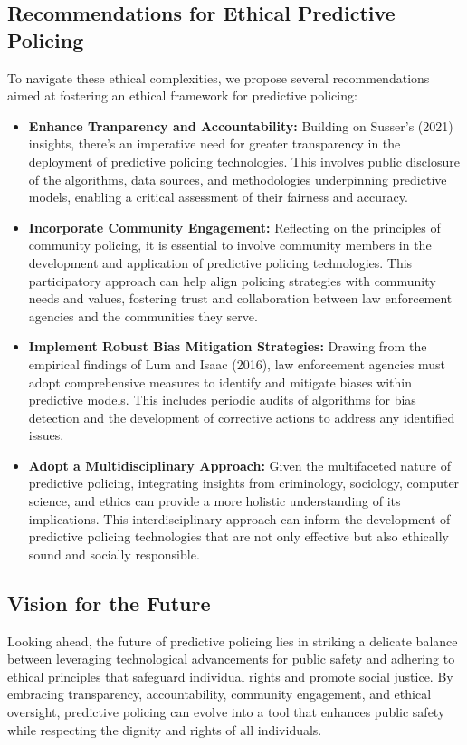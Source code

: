 \documentclass[man, noextraspace]{apa7} %
\begin{document}
\subsection{Recommendations for Ethical Predictive Policing}
To navigate these ethical complexities, we propose several recommendations aimed at fostering an ethical framework for predictive policing:
\begin{itemize}
    \item \textbf{Enhance Tranparency and Accountability:} Building on Susser’s (2021) insights, there's an imperative need for greater transparency in the deployment of predictive policing technologies. This involves public disclosure of the algorithms, data sources, and methodologies underpinning predictive models, enabling a critical assessment of their fairness and accuracy.
    \item \textbf{Incorporate Community Engagement:}  Reflecting on the principles of community policing, it is essential to involve community members in the development and application of predictive policing technologies. This participatory approach can help align policing strategies with community needs and values, fostering trust and collaboration between law enforcement agencies and the communities they serve.
    \item \textbf{Implement Robust Bias Mitigation Strategies:} Drawing from the empirical findings of Lum and Isaac (2016), law enforcement agencies must adopt comprehensive measures to identify and mitigate biases within predictive models. This includes periodic audits of algorithms for bias detection and the development of corrective actions to address any identified issues.
    \item \textbf{Adopt a Multidisciplinary Approach:} Given the multifaceted nature of predictive policing, integrating insights from criminology, sociology, computer science, and ethics can provide a more holistic understanding of its implications. This interdisciplinary approach can inform the development of predictive policing technologies that are not only effective but also ethically sound and socially responsible.
\end{itemize}

\subsection{Vision for the Future}
Looking ahead, the future of predictive policing lies in striking a delicate balance between leveraging technological advancements for public safety and adhering to ethical principles that safeguard individual rights and promote social justice. By embracing transparency, accountability, community engagement, and ethical oversight, predictive policing can evolve into a tool that enhances public safety while respecting the dignity and rights of all individuals. \vspace{1cm}
\end{document}

